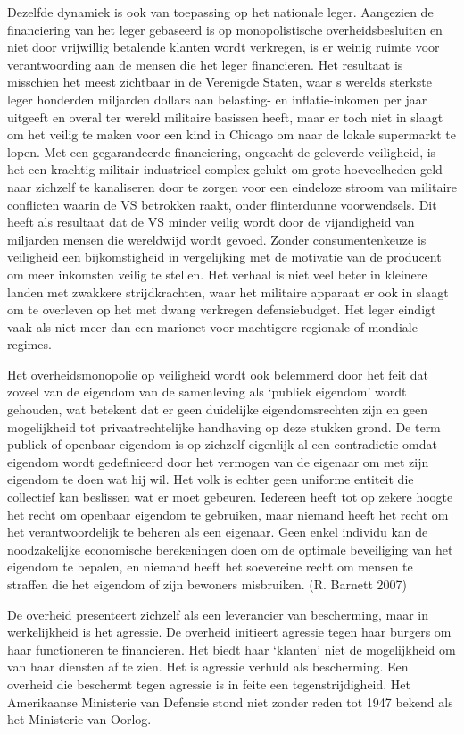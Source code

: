 \documentclass[
  a5paper,
  smalldemyvopaper,11pt,twoside,onecolumn,openright,extrafontsizes,
hidelinks]{memoir}
\begin{document}
Dezelfde dynamiek is ook van toepassing op het nationale leger.
Aangezien de financiering van het leger gebaseerd is op monopolistische
overheidsbesluiten en niet door vrijwillig betalende klanten wordt
verkregen, is er weinig ruimte voor verantwoording aan de mensen die het
leger financieren. Het resultaat is misschien het meest zichtbaar in de
Verenigde Staten, waar s werelds sterkste leger honderden miljarden
dollars aan belasting- en inflatie-inkomen per jaar uitgeeft en overal
ter wereld militaire basissen heeft, maar er toch niet in slaagt om het
veilig te maken voor een kind in Chicago om naar de lokale supermarkt te
lopen. Met een gegarandeerde financiering, ongeacht de geleverde
veiligheid, is het een krachtig militair-industrieel complex gelukt om
grote hoeveelheden geld naar zichzelf te kanaliseren door te zorgen voor
een eindeloze stroom van militaire conflicten waarin de VS betrokken
raakt, onder flinterdunne voorwendsels. Dit heeft als resultaat dat de
VS minder veilig wordt door de vijandigheid van miljarden mensen die
wereldwijd wordt gevoed. Zonder consumentenkeuze is veiligheid een
bijkomstigheid in vergelijking met de motivatie van de producent om meer
inkomsten veilig te stellen. Het verhaal is niet veel beter in kleinere
landen met zwakkere strijdkrachten, waar het militaire apparaat er ook
in slaagt om te overleven op het met dwang verkregen defensiebudget. Het
leger eindigt vaak als niet meer dan een marionet voor machtigere
regionale of mondiale regimes.

Het overheidsmonopolie op veiligheid wordt ook belemmerd door het feit
dat zoveel van de eigendom van de samenleving als `publiek eigendom'
wordt gehouden, wat betekent dat er geen duidelijke eigendomsrechten
zijn en geen mogelijkheid tot privaatrechtelijke handhaving op deze
stukken grond. De term publiek of openbaar eigendom is op zichzelf
eigenlijk al een contradictie omdat eigendom wordt gedefinieerd door het
vermogen van de eigenaar om met zijn eigendom te doen wat hij wil. Het
volk is echter geen uniforme entiteit die collectief kan beslissen wat
er moet gebeuren. Iedereen heeft tot op zekere hoogte het recht om
openbaar eigendom te gebruiken, maar niemand heeft het recht om het
verantwoordelijk te beheren als een eigenaar. Geen enkel individu kan de
noodzakelijke economische berekeningen doen om de optimale beveiliging
van het eigendom te bepalen, en niemand heeft het soevereine recht om
mensen te straffen die het eigendom of zijn bewoners misbruiken. (R.
Barnett 2007)

De overheid presenteert zichzelf als een leverancier van bescherming,
maar in werkelijkheid is het agressie. De overheid initieert agressie
tegen haar burgers om haar functioneren te financieren. Het biedt haar
`klanten' niet de mogelijkheid om van haar diensten af te zien. Het is
agressie verhuld als bescherming. Een overheid die beschermt tegen
agressie is in feite een tegenstrijdigheid. Het Amerikaanse Ministerie
van Defensie stond niet zonder reden tot 1947 bekend als het Ministerie
van Oorlog.
\end{document}
